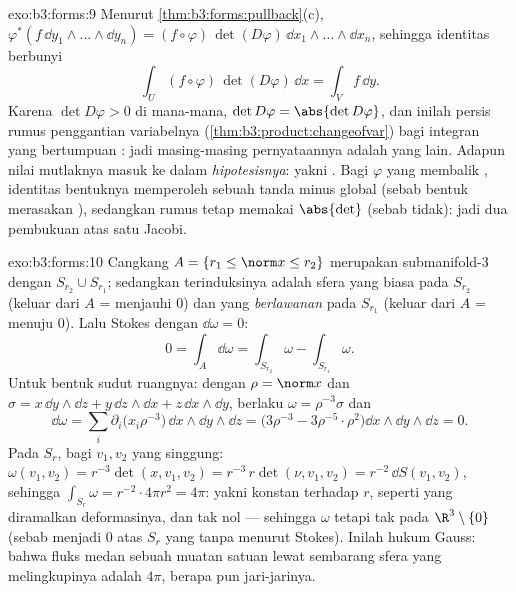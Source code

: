\begin{solution}{exo:b3:forms:9}
Menurut \cref{thm:b3:forms:pullback}(c),
$\varphi^*(f\,\dd y_1\wedge\dots\wedge\dd y_n) =
(f\circ\varphi)\,\det(D\varphi)\,\dd
x_1\wedge\dots\wedge\dd x_n$, sehingga identitas  berbunyi
\[
\int_U(f\circ\varphi)\,\det(D\varphi)\,\dd x = \int_Vf\,\dd
y .
\]
Karena $\det D\varphi > 0$ di mana-mana, $\det D\varphi =
\abs{\det D\varphi}$, dan inilah persis rumus
penggantian variabelnya
(\cref{thm:b3:product:changeofvar}) bagi integran 
yang bertumpuan : jadi masing-masing pernyataannya adalah
yang lain. Adapun nilai mutlaknya masuk ke dalam \emph{hipotesisnya}:
yakni . Bagi $\varphi$ yang membalik , identitas
bentuknya memperoleh sebuah tanda minus global (sebab bentuk merasakan
), sedangkan rumus  tetap memakai $\abs{\det}$
(sebab  tidak): jadi dua pembukuan atas satu Jacobi.
\end{solution}

\begin{solution}{exo:b3:forms:10}
Cangkang $A = \{r_1 \leq \norm x \leq r_2\}$ merupakan
submanifold-$3$  dengan  $S_{r_2}\cup S_{r_1}$; sedangkan
 terinduksinya adalah  sfera yang biasa pada
$S_{r_2}$ (keluar dari $A$ = menjauhi $0$) dan yang
\emph{berlawanan} pada $S_{r_1}$ (keluar dari $A$ = menuju
$0$). Lalu Stokes dengan $\dd\omega = 0$:
\[
0 = \int_A\dd\omega = \int_{S_{r_2}}\omega -
\int_{S_{r_1}}\omega .
\]
Untuk bentuk sudut ruangnya: dengan $\rho = \norm x$ dan $\sigma =
x\,\dd y\wedge\dd z + y\,\dd z\wedge\dd x + z\,\dd
x\wedge\dd y$, berlaku $\omega = \rho^{-3}\sigma$ dan
\[
\dd\omega = \sum_i\partial_i\bigl(x_i\rho^{-3}\bigr)\,
\dd x\wedge\dd y\wedge\dd z
= \bigl(3\rho^{-3} - 3\rho^{-5}\cdot\rho^2\bigr)\dd
x\wedge\dd y\wedge\dd z = 0 .
\]
Pada $S_r$, bagi $v_1, v_2$ yang singgung: $\omega(v_1, v_2) =
r^{-3}\det(x, v_1, v_2) = r^{-3}\,r\det(\nu, v_1, v_2) =
r^{-2}\,\dd S(v_1, v_2)$, sehingga $\int_{S_r}\omega =
r^{-2}\cdot4\pi r^2 = 4\pi$: yakni konstan terhadap $r$, seperti yang diramalkan
deformasinya, dan tak nol --- sehingga $\omega$  tetapi tak
 pada $\R^3\setminus\{0\}$ (sebab   menjadi
$0$ atas $S_r$ yang tanpa  menurut Stokes). Inilah hukum
Gauss: bahwa fluks medan sebuah muatan satuan lewat sembarang
sfera yang melingkupinya adalah $4\pi$, berapa pun jari-jarinya.
\end{solution}

